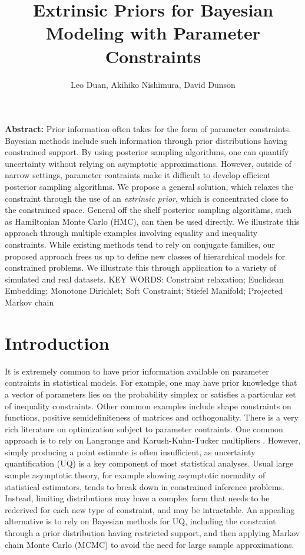 \documentclass[10pt]{article}
\title{\textbf{Extrinsic Priors for Bayesian Modeling with Parameter Constraints}}
\author{Leo Duan, Akihiko Nishimura, David Dunson}
\date{}
\DeclareMathOperator{\1}{\mathbbm{1}}
\begin{document}
\maketitle
{\bf Abstract:} Prior information often takes for the form of parameter constraints. Bayesian methods include such information through prior distributions having constrained support. By using posterior sampling algorithms, one can quantify uncertainty without relying on asymptotic approximations. However, outside of narrow settings, parameter contraints make it difficult to develop efficient posterior sampling algorithms. We propose a general solution, which relaxes the constraint through the use of an {\em extrinsic prior}, which is concentrated close to the constrained space. General off the shelf posterior sampling algorithms, such as Hamiltonian Monte Carlo (HMC), can then be used directly. We illustrate this approach through multiple examples involving equality and inequality constraints. While existing methods tend to rely on conjugate families, our proposed approach frees us up to define new classes of hierarchical models for constrained problems. We illustrate this through application to a variety of simulated and real datasets.
\vskip 12pt
{\noindent KEY WORDS: Constraint relaxation; Euclidean Embedding; Monotone Dirichlet; Soft Constraint; Stiefel Manifold; Projected Markov chain}
{}


\section{Introduction}
It is extremely common to have prior information available on parameter contraints in statistical models. For example, one may have prior knowledge that a vector of parameters lies on the probability simplex or satisfies a particular set of inequality constraints. Other common examples include shape constraints on functions, positive semidefiniteness of matrices and orthogonality. There is a very rich literature on optimization subject to parameter contraints. One common approach is to rely on Langrange and Karush-Kuhn-Tucker multipliers \citep{boyd2004convex}. However, simply producing a point estimate is often insufficient, as uncertainty quantification (UQ) is a key component of most statistical analyses. Usual large sample asymptotic theory, for example showing asymptotic normality of statistical estimators, tends to break down in constrained inference problems. Instead, limiting distributions may have a complex form that needs to be rederived for each new type of constraint, and may be intractable. An appealing alternative is to rely on Bayesian methods for UQ, including the constraint through a prior distribution having restricted support, and then applying Markov chain Monte Carlo (MCMC) to avoid the need for large sample approximations.
\end{document}
